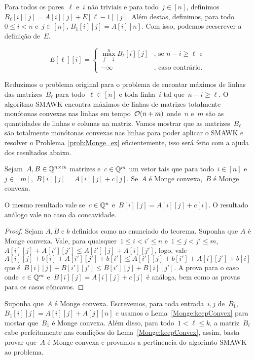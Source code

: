 Para todos os pares~$\ell$ e~$i$ não triviais e para todo~$j \in [n]$, definimos~$B_\ell[i][j] = A[i][j] + E[\ell-1][j]$. Além destas, definimos, para todo~$0 \leq i < n$ e~$j \in [n]$, $B_1[i][j] = A[i][n]$. Com isso, podemos reescrever a definição de~$E$.

\begin{equation*}
E[\ell][i] = \begin{cases}
    \max\limits_{j=1}^n B_\ell[i][j]                        & \text{, se } n - i \geq \ell \text{ e } \\
    -\infty                                                 & \text{, caso contrário.}
\end{cases}
\end{equation*}

Reduzimos o problema original para o problema de encontar máximos de linhas das matrizes~$B_\ell$ para todo~$\ell \in [n]$ e toda linha~$i$ tal que~$n - i \geq \ell$. O algoritmo SMAWK encontra máximos de linhas de matrizes totalmente monótonas convexas nas linhas em tempo~$\mathcal{O}(n + m)$ onde~$n$ e~$m$ são as quantidades de linhas e colunas na matriz. Vamos mostrar que as matrizes~$B_\ell$ são totalmente monótonas convexas nas linhas para poder aplicar o SMAWK e resolver o Problema~\ref{prob:Monge_ex} eficientemente, isso será feito com a ajuda dos resultados abaixo.

\begin{lema} \label{Monge:keepConvex}
Sejam~$A,B \in \mathbb{Q}^{n \times m}$ matrizes e~$c \in \mathbb{Q}^m$ um vetor tais que para todo~$i \in [n]$ e~$j \in [m]$,~${B[i][j] = A[i][j] + c[j]}$. Se~$A$ é Monge convexa,~$B$ é Monge convexa.  

O mesmo resultado vale se~$c \in \mathbb{Q}^n$ e~${B[i][j] = A[i][j] + c[i]}$. O resultado análogo vale no caso da concavidade.
\end{lema}

\begin{proof}
Sejam $A,B$ e $b$ definidos como no enunciado do teorema. Suponha que $A$ é Monge convexa. Vale, para quaisquer~${1 \leq i < i' \leq n}$ e~${1 \leq j < j' \leq m}$,~${A[i][j] + A[i'][j'] \leq A[i'][j] + A[i][j']}$, logo, vale~${A[i][j] + b[i] + A[i'][j'] + b[i'] \leq A[i'][j] + b[i'] + A[i][j'] + b[i]}$ que é~${B[i][j] + B[i'][j'] \leq B[i'][j] + B[i][j']}$. A prova para o caso onde~$c \in \mathbb{Q}^m$ e~${B[i][j] = A[i][j] + c[j]}$ é análoga, bem como as provas para os casos côncavos.
\end{proof}

Suponha que~$A$ é Monge convexa. Escrevemos, para toda entrada~$i,j$ de~$B_1$,~$B_1[i][j] = A[i][j] + A[j][n]$ e usamos o Lema~\ref{Monge:keepConvex} para mostar que~$B_1$ é Monge convexa. Além disso, para todo~$1 < \ell \leq k$, a matriz~$B_\ell$ cabe perfeitamente nas condições do Lema~\ref{Monge:keepConvex}, assim, basta provar que~$A$ é Monge convexa e provamos a pertinencia do algorimto SMAWK ao problema.

